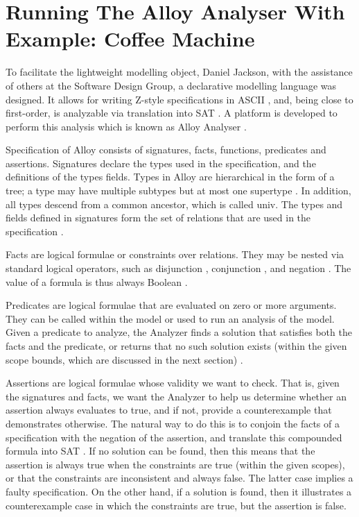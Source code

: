 \documentclass[a4paper,10pt]{report}
\begin{document}
\chapter{Running The Alloy Analyser With Example: Coffee Machine}

To facilitate the lightweight modelling object, Daniel Jackson, with the assistance of others at the Software Design Group, a declarative modelling language was designed. It allows for writing Z-style specifications in ASCII \cite{J.M.Spivey1989}, and, being close to first-order, is analyzable via translation into SAT . A platform is developed to perform this analysis which is known as Alloy Analyser \cite{Yeung2005}.

Specification of Alloy consists of signatures, facts, functions, predicates and assertions. Signatures declare the types used in the specification, and the definitions of the types fields. Types in Alloy are hierarchical in the form of a tree; a type may have multiple subtypes but at most one supertype \cite{JonathanEdwards}. In addition, all types descend from a common ancestor, which is called univ. The types and fields defined in signatures form the set of relations that are used in the specification \cite{Yeung2005}.

Facts are logical formulae or constraints over relations. They may be nested via standard logical operators, such as disjunction , conjunction , and negation . The value of a formula is thus always Boolean \cite{Yeung2005}.

Predicates are logical formulae that are evaluated on zero or more arguments. They can be called within the model or used to run an analysis of the model. Given a predicate to analyze, the Analyzer finds a solution that satisfies both the facts and the predicate, or returns that no such solution exists (within the given scope bounds, which are discussed in the next section) \cite{Yeung2005}.

Assertions are logical formulae whose validity we want to check. That is, given the signatures and facts, we want the Analyzer to help us determine whether an assertion always evaluates to true, and if not, provide a counterexample that demonstrates otherwise. The natural way to do this is to conjoin the facts of a specification with the negation of the assertion, and translate this compounded formula into SAT \cite{Strichman}. If no solution can be found, then this means that the assertion is always true when the constraints are true (within the given scopes), or that the constraints are inconsistent and always false. The latter case implies a faulty specification. On the other hand, if a solution is found, then it illustrates a counterexample case in which the constraints are true, but the assertion is false. 
\end{document}
